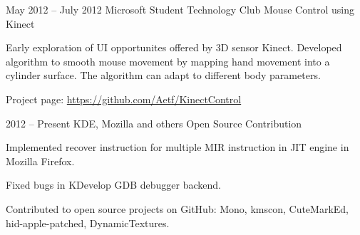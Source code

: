 \documentclass{tccv}
\begin{document}
\begin{eventlist}
\item{May 2012 -- July 2012}
     {Microsoft Student Technology Club}
     {Mouse Control using Kinect}

Early exploration of UI opportunites offered by 3D sensor Kinect. Developed algorithm to smooth mouse 
movement by mapping hand movement into a cylinder surface. The algorithm can adapt to different body 
parameters.

Project page: \href{https://github.com/Aetf/KinectControl}{https://github.com/Aetf/KinectControl}

\item{2012 -- Present}
     {KDE, Mozilla and others}
     {Open Source Contribution}

Implemented recover instruction for multiple MIR instruction in JIT engine in Mozilla Firefox.

Fixed bugs in KDevelop GDB debugger backend.

Contributed to open source projects on GitHub: Mono, kmscon, CuteMarkEd, hid-apple-patched, 
DynamicTextures.

\end{eventlist}
\end{document}
